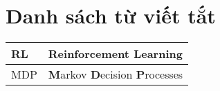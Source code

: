 \chapter*{\centering\Large{Danh sách từ viết tắt}}

\begin{tabular}{| p{} |p{} |}

        \hline
        RL &  \textbf{R}einforcement \textbf{L}earning        \\
        \hline
        MDP &  \textbf{M}arkov \textbf{D}ecision \textbf{P}rocesses     \\
        \hline
\end{tabular} \\


